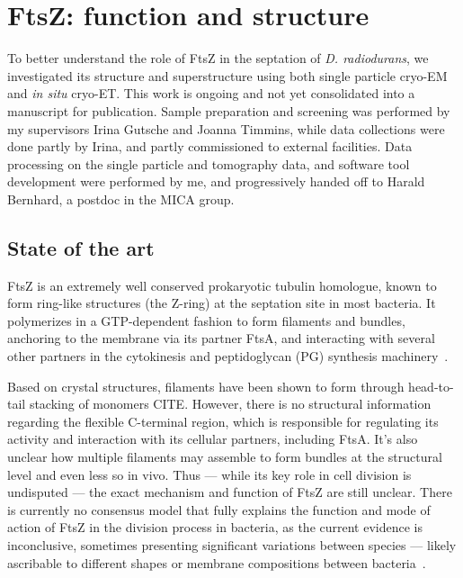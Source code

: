 \chapter{FtsZ: function and structure}\label{ftsz}

To better understand the role of FtsZ in the septation of \textit{D. radiodurans}, we investigated its structure and superstructure using both single particle cryo-EM and \textit{in situ} cryo-ET.
This work is ongoing and not yet consolidated into a manuscript for publication.
Sample preparation and screening was performed by my supervisors Irina Gutsche and Joanna Timmins, while data collections were done partly by Irina, and partly commissioned to external facilities.
Data processing on the single particle and tomography data, and software tool development were performed by me, and progressively handed off to Harald Bernhard, a postdoc in the MICA group.

\localtableofcontents

\section{State of the art}

FtsZ is an extremely well conserved prokaryotic tubulin homologue, known to form ring-like structures (the Z-ring) at the septation site in most bacteria.
It polymerizes in a GTP-dependent fashion to form filaments and bundles, anchoring to the membrane via its partner FtsA, and interacting with several other partners in the cytokinesis and peptidoglycan (PG) synthesis machinery~\cite{barrowsFtsZDynamicsBacterial2021,mcquillenInsightsStructureFunction2020}.

Based on crystal structures, filaments have been shown to form through head-to-tail stacking of monomers CITE.
However, there is no structural information regarding the flexible C-terminal region, which is responsible for regulating its activity and interaction with its cellular partners, including FtsA.
It's also unclear how multiple filaments may assemble to form bundles at the structural level and even less so in vivo.
Thus --- while its key role in cell division is undisputed --- the exact mechanism and function of FtsZ are still unclear.
There is currently no consensus model that fully explains the function and mode of action of FtsZ in the division process in bacteria, as the current evidence is inconclusive, sometimes presenting significant variations between species --- likely ascribable to different shapes or membrane compositions between bacteria~\cite{barrowsFtsZDynamicsBacterial2021,mcquillenInsightsStructureFunction2020}.


